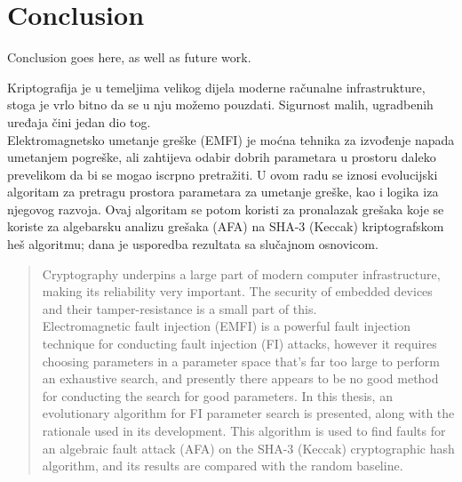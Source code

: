 \documentclass[times, utf8, diplomski]{fer}
\begin{document}
\chapter{Conclusion}\label{ch:conclusion}
Conclusion goes here, as well as future work.




\begin{sazetak}
Kriptografija je u temeljima velikog dijela moderne računalne infrastrukture,
stoga je vrlo bitno da se u nju možemo pouzdati. Sigurnost malih, ugradbenih
uređaja čini jedan dio tog. \\
Elektromagnetsko umetanje greške (EMFI) je moćna tehnika za izvođenje napada
umetanjem pogreške, ali zahtijeva odabir dobrih parametara u prostoru daleko
prevelikom da bi se mogao iscrpno pretražiti. U ovom radu se iznosi evolucijski
algoritam za pretragu prostora parametara za umetanje greške, kao i logika
iza njegovog razvoja. Ovaj algoritam se potom koristi za pronalazak grešaka
koje se koriste za algebarsku analizu grešaka (AFA) na SHA-3 (Keccak)
kriptografskom heš algoritmu; dana je usporedba rezultata sa slučajnom
osnovicom.

\end{sazetak}

\begin{abstract}
Cryptography underpins a large part of modern computer infrastructure, making
its reliability very important. The security of embedded devices and their
tamper-resistance is a small part of this. \\
Electromagnetic fault injection (EMFI) is a powerful fault injection technique
for conducting fault injection (FI) attacks, however it requires choosing
parameters in a parameter space that's far too large to perform an exhaustive
search, and presently there appears to be no good method for conducting the
search for good parameters. In this thesis, an evolutionary algorithm for FI
parameter search is presented, along with the rationale used in its development.
This algorithm is used to find faults for an algebraic fault attack (AFA) on the
SHA-3 (Keccak) cryptographic hash algorithm, and its results are compared with
the random baseline.

\end{abstract}
\end{document}
